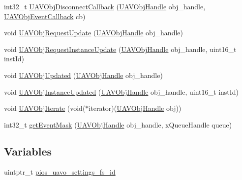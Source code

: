 \begin{DoxyCompactItemize}
\item 
int32\-\_\-t \hyperlink{group___u_a_v_object_handling_gadfa431fdf460097d8a6aa13f0a722ac0}{\-U\-A\-V\-Obj\-Disconnect\-Callback} (\hyperlink{targets_2_u_a_v_objects_2inc_2uavobjectmanager_8h_a279053e22be53ce9f895043aaeb91e3b}{\-U\-A\-V\-Obj\-Handle} obj\-\_\-handle, \hyperlink{targets_2_u_a_v_objects_2inc_2uavobjectmanager_8h_a33d11560e38b56dc904220fb0f785c28}{\-U\-A\-V\-Obj\-Event\-Callback} cb)
\item 
void \hyperlink{group___u_a_v_object_handling_gaef845ac7a3065b37998fa12f85856cc3}{\-U\-A\-V\-Obj\-Request\-Update} (\hyperlink{targets_2_u_a_v_objects_2inc_2uavobjectmanager_8h_a279053e22be53ce9f895043aaeb91e3b}{\-U\-A\-V\-Obj\-Handle} obj\-\_\-handle)
\item 
void \hyperlink{group___u_a_v_object_handling_ga178c0681bdf228a409bcd12d8a10a260}{\-U\-A\-V\-Obj\-Request\-Instance\-Update} (\hyperlink{targets_2_u_a_v_objects_2inc_2uavobjectmanager_8h_a279053e22be53ce9f895043aaeb91e3b}{\-U\-A\-V\-Obj\-Handle} obj\-\_\-handle, uint16\-\_\-t inst\-Id)
\item 
void \hyperlink{group___u_a_v_object_handling_gaadcab3b60f3004ccba0c5efa5c5bfb57}{\-U\-A\-V\-Obj\-Updated} (\hyperlink{targets_2_u_a_v_objects_2inc_2uavobjectmanager_8h_a279053e22be53ce9f895043aaeb91e3b}{\-U\-A\-V\-Obj\-Handle} obj\-\_\-handle)
\item 
void \hyperlink{group___u_a_v_object_handling_ga90b88ba1823a707558d3056663d0c0c9}{\-U\-A\-V\-Obj\-Instance\-Updated} (\hyperlink{targets_2_u_a_v_objects_2inc_2uavobjectmanager_8h_a279053e22be53ce9f895043aaeb91e3b}{\-U\-A\-V\-Obj\-Handle} obj\-\_\-handle, uint16\-\_\-t inst\-Id)
\item 
void \hyperlink{group___u_a_v_object_handling_ga207c169e5af27b411cb6a08608369bdb}{\-U\-A\-V\-Obj\-Iterate} (void($\ast$iterator)(\hyperlink{targets_2_u_a_v_objects_2inc_2uavobjectmanager_8h_a279053e22be53ce9f895043aaeb91e3b}{\-U\-A\-V\-Obj\-Handle} obj))
\item 
int32\-\_\-t \hyperlink{group___u_a_v_object_handling_gae4645220de84508ec16b5b028a52f325}{get\-Event\-Mask} (\hyperlink{targets_2_u_a_v_objects_2inc_2uavobjectmanager_8h_a279053e22be53ce9f895043aaeb91e3b}{\-U\-A\-V\-Obj\-Handle} obj\-\_\-handle, x\-Queue\-Handle queue)
\end{DoxyCompactItemize}
\subsection*{\-Variables}
\begin{DoxyCompactItemize}
\item 
uintptr\-\_\-t \hyperlink{group___u_a_v_object_handling_gab060f441dd600b08386c0ca1b487217a}{pios\-\_\-uavo\-\_\-settings\-\_\-fs\-\_\-id}
\end{DoxyCompactItemize}


